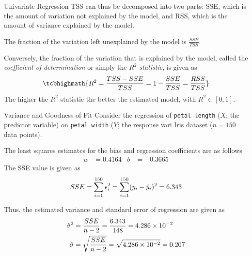 \begin{frame}{Univariate Regression}
TSS can thus be decomposed into two parts: SSE, which is the
amount of variation not explained by the model, 
and RSS, which is the amount of variance explained
by the model.

\medskip


The fraction of the variation left unexplained by the model is %
$\frac{SSE}{TSS}$. 

\medskip

Conversely, the fraction of the
variation that is explained by the model, called the {\em coefficient
of determination} or simply the {\em $R^2$ statistic}, is given as
\begin{align*}
    \tcbhighmath{
    R^2 = \frac{TSS - SSE}{TSS} = 1 - \frac{SSE}{TSS} = \frac{RSS}{TSS}}
\end{align*}
The higher the $R^2$ statistic the better the estimated model, with $R^2 \in
[0,1]$.
\end{frame}
%
\begin{frame}{Variance and Goodness of Fit}
   Consider %
the
   regression of {\tt petal length} ($X$; the predictor variable) on 
    {\tt petal width} ($Y$; the response vari%
   Iris dataset
	($n=150$ data points).

	\medskip

    The least squares estimates for the bias and regression coefficients
    are as follows
    \begin{align*}
        w & = 0.4164 & b & = -0.3665
    \end{align*}
    The SSE value is given as
    \begin{align*}
        SSE = \sum_{i=1}^{150} \epsilon_i^2 
        = \sum_{i=1}^{150} (y_i - \hat{y}_i)^2 = 6.343
    \end{align*}
    
    Thus, the estimated variance and standard error of regression are given as
    \begin{align*}
        \hat{\sigma}^2 & = \frac{SSE}{n-2} = \frac{6.343}{148} = 4.286 \times 10^{-2}\\
        \hat{\sigma} & = \sqrt{\frac{SSE}{n-2}} = \sqrt{4.286 \times 10^{-2}} = 0.207
    \end{align*}
\end{frame}

